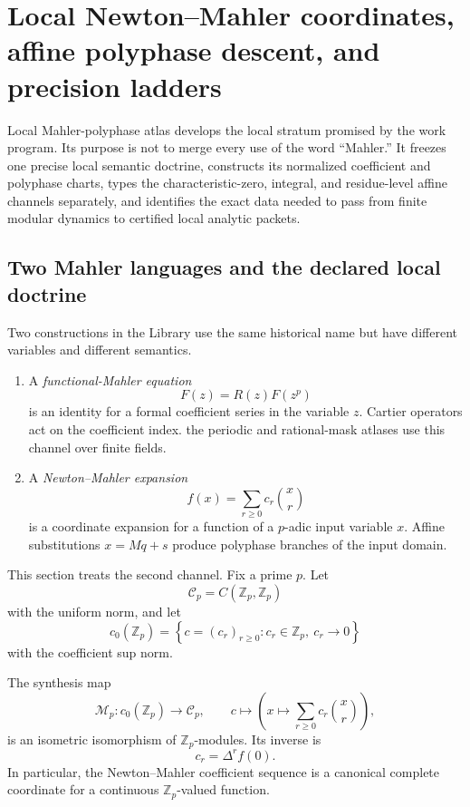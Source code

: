 \section{Local Newton--Mahler coordinates, affine polyphase descent, and precision ladders}
\label{sec:block08-local}

Local Mahler-polyphase atlas develops the local stratum promised by the work program.  Its purpose is not to merge every use of the word ``Mahler.''  It freezes one precise local semantic doctrine, constructs its normalized coefficient and polyphase charts, types the characteristic-zero, integral, and residue-level affine channels separately, and identifies the exact data needed to pass from finite modular dynamics to certified local analytic packets.

\subsection{Two Mahler languages and the declared local doctrine}
\label{subsec:block08-two-languages}

Two constructions in the Library use the same historical name but have different variables and different semantics.

\begin{enumerate}
\item A \emph{functional-Mahler equation}
\[
 F(z)=R(z)F(z^p)
\]
is an identity for a formal coefficient series in the variable \(z\).  Cartier operators act on the coefficient index.  the periodic and rational-mask atlases use this channel over finite fields.
\item A \emph{Newton--Mahler expansion}
\[
 f(x)=\sum_{r\geq0}c_r\binom xr
\]
is a coordinate expansion for a function of a \(p\)-adic input variable \(x\).  Affine substitutions \(x=Mq+s\) produce polyphase branches of the input domain.
\end{enumerate}

This section treats the second channel.  Fix a prime \(p\).  Let
\[
 \mathcal C_p=C(\mathbb Z_p,\mathbb Z_p)
\]
with the uniform norm, and let
\[
 c_0(\mathbb Z_p)
 =
 \left\{c=(c_r)_{r\geq0}:c_r\in\mathbb Z_p,\ c_r\longrightarrow0\right\}
\]
with the coefficient sup norm.

\begin{theorem}
\label{thm:block08-mahler-coordinate}
The synthesis map
\[
 \mathcal M_p:c_0(\mathbb Z_p)\longrightarrow\mathcal C_p,
 \qquad
 c\longmapsto
 \left(x\longmapsto\sum_{r\geq0}c_r\binom xr\right),
\]
is an isometric isomorphism of \(\mathbb Z_p\)-modules.  Its inverse is
\[
 \boxed{c_r=\Delta^r f(0).}
\]
In particular, the Newton--Mahler coefficient sequence is a canonical complete coordinate for a continuous \(\mathbb Z_p\)-valued function.
\end{theorem}

